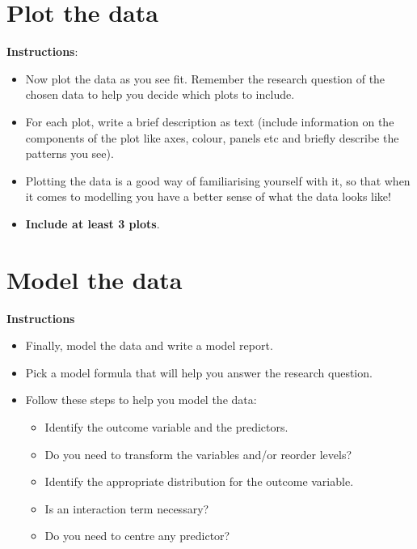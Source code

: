 \documentclass[
]{article}
\providecommand{\tightlist}{%
  \setlength{\itemsep}{0pt}\setlength{\parskip}{0pt}}
\begin{document}
\section{Plot the data}\label{plot-the-data}

\textbf{Instructions}:

\begin{itemize}
\tightlist
\item
  Now plot the data as you see fit. Remember the research question of
  the chosen data to help you decide which plots to include.
\item
  For each plot, write a brief description as text (include information
  on the components of the plot like axes, colour, panels etc and
  briefly describe the patterns you see).
\item
  Plotting the data is a good way of familiarising yourself with it, so
  that when it comes to modelling you have a better sense of what the
  data looks like!
\item
  \textbf{Include at least 3 plots}.
\end{itemize}

\section{Model the data}\label{model-the-data}

\textbf{Instructions}

\begin{itemize}
\tightlist
\item
  Finally, model the data and write a model report.
\item
  Pick a model formula that will help you answer the research question.
\item
  Follow these steps to help you model the data:

  \begin{itemize}
  \tightlist
  \item
    Identify the outcome variable and the predictors.
  \item
    Do you need to transform the variables and/or reorder levels?
  \item
    Identify the appropriate distribution for the outcome variable.
  \item
    Is an interaction term necessary?
  \item
    Do you need to centre any predictor?
  \end{itemize}
\end{itemize}
\end{document}
